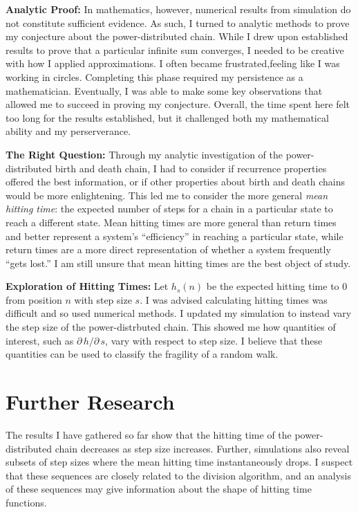 \documentclass[12pt,letterpaper]{article}
\begin{document}
\noindent
\textbf{Analytic Proof:} In mathematics, however, numerical results from simulation do not constitute
sufficient evidence. As such, I turned to analytic methods to prove my conjecture about the
power-distributed chain. While I drew upon established results to prove that a particular infinite sum
converges, I needed to be creative with how I applied approximations. I often became frustrated,feeling
like I was working in circles. Completing this phase required my persistence as a mathematician.
Eventually, I was able to make some key observations that allowed me to succeed in proving my
conjecture.  Overall, the time spent here felt too long for the results established, but it challenged
both my mathematical ability and my perserverance.

\noindent \textbf{The Right Question:} Through my analytic investigation of the power-distributed birth
and death chain, I had to consider if recurrence properties offered the best information, or if other
properties about birth and death chains would be more enlightening. This led me to consider the more
general \emph{mean hitting time}: the expected number of steps for a chain in a particular state to
reach a different state. Mean hitting times are more general than return times and better represent
a system's ``efficiency'' in reaching a particular state, while return times are a more direct
representation of whether a system frequently ``gets lost.'' I am still unsure that mean hitting times
are the best object of study.

\noindent
\textbf{Exploration of Hitting Times:} Let $h_s(n)$ be the expected hitting time to $0$ from position
$n$ with step size $s$. I was advised calculating hitting times was difficult and so used numerical
methods. I updated my simulation to instead vary the step size of the power-distrbuted chain. This
showed me how quantities of interest, such as $\partial\, h/ \partial\, s$, vary with respect to step
size. I believe that these quantities can be used to classify the fragility of a random walk.


\section*{Further Research}
The results I have gathered so far show that the hitting time of the power-distributed chain decreases
as step size increases. Further, simulations also reveal subsets of step sizes where the mean hitting
time instantaneously drops. I suspect that these sequences are closely related to the division
algorithm, and an analysis of these sequences may give information about the shape of hitting time
functions.
\end{document}
